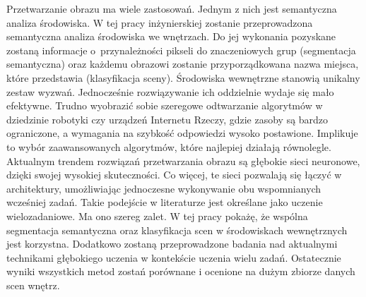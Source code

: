 Przetwarzanie obrazu ma wiele zastosowań. Jednym z nich jest semantyczna analiza środowiska. W tej pracy inżynierskiej zostanie przeprowadzona semantyczna analiza środowiska we wnętrzach. Do jej wykonania pozyskane zostaną informacje o~przynależności pikseli do znaczeniowych grup (segmentacja semantyczna) oraz każdemu obrazowi zostanie przyporządkowana nazwa miejsca, które przedstawia (klasyfikacja sceny). Środowiska wewnętrzne stanowią unikalny zestaw wyzwań. Jednocześnie rozwiązywanie ich oddzielnie wydaje się mało efektywne. Trudno wyobrazić sobie szeregowe odtwarzanie algorytmów w dziedzinie robotyki czy urządzeń Internetu Rzeczy, gdzie zasoby są bardzo ograniczone, a wymagania na szybkość odpowiedzi wysoko postawione. Implikuje to wybór zaawansowanych algorytmów, które najlepiej działają równolegle. Aktualnym trendem rozwiązań przetwarzania obrazu są głębokie sieci neuronowe, dzięki swojej wysokiej skuteczności. Co więcej, te sieci pozwalają się łączyć w architektury, umożliwiając jednoczesne wykonywanie obu wspomnianych wcześniej zadań. Takie podejście w literaturze jest określane jako uczenie wielozadaniowe. Ma ono szereg zalet. W tej pracy pokażę, że wspólna segmentacja semantyczna oraz klasyfikacja scen w środowiskach wewnętrznych jest korzystna. Dodatkowo zostaną przeprowadzone badania nad aktualnymi technikami głębokiego uczenia w kontekście uczenia wielu zadań. Ostatecznie wyniki wszystkich metod zostań porównane i ocenione na dużym zbiorze danych scen wnętrz.



